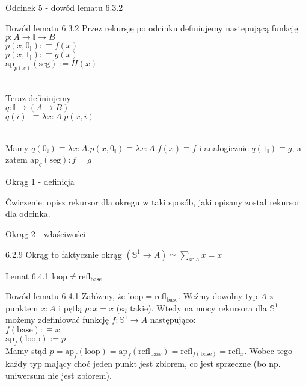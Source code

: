 \documentclass{beamer}
\newcommand{\defn}{:\equiv}
\newcommand{\refl}[1]{\text{refl}_{#1}}
\newcommand{\ap}[2]{\text{ap}_{#1}(#2)}
\newcommand{\hS}{\mathbb{S}^1}
\newcommand{\base}{\text{base}}
\newcommand{\looop}{\text{loop}}
\newcommand{\I}{\mathbb{I}}
\newcommand{\IZ}{0_\mathbb{I}}
\newcommand{\II}{1_\mathbb{I}}
\newcommand{\seg}{\text{seg}}
\begin{document}
\begin{frame}{Odcinek 5 - dowód lematu 6.3.2}
\begin{block}{Dowód lematu 6.3.2}
	Przez rekursję po odcinku definiujemy nastepującą funkcję: \\
	$p : A \to \I \to B$ \\
	$p(x, \IZ) \defn f(x)$ \\
	$p(x, \II) \defn g(x)$ \\
	$\ap{p(x)}{\seg} := H(x)$ \\~\
	
	Teraz definiujemy \\
	$q : \I \to (A \to B)$ \\
	$q(i) \defn \lambda x : A. p(x, i)$ \\~\
	
	Mamy $q(\IZ) \equiv \lambda x : A. p(x, \IZ) \equiv \lambda x : A. f(x) \equiv f$ i analogicznie $q(\II) \equiv g$, a zatem $\ap{q}{\seg} : f = g$
\end{block}
\end{frame}


\begin{frame}{Okrąg 1 - definicja}


Ćwiczenie: opisz rekursor dla okręgu w taki sposób, jaki opisany został rekursor dla odcinka.

\end{frame}

\begin{frame}{Okrąg 2 - właściwości}
	
\begin{block}{6.2.9 Okrąg to faktycznie okrąg}
$(\hS \to A) \simeq \sum_{x : A} x = x$
\end{block}

\begin{block}{Lemat 6.4.1}
$\looop \neq \refl{\base}$
\end{block}

\begin{block}{Dowód lematu 6.4.1}
Załóżmy, że $\looop = \refl{\base}$. Weźmy dowolny typ $A$ z punktem $x : A$ i pętlą $p : x = x$ (są takie). Wtedy na mocy rekursora dla $\hS$ możemy zdefiniować funkcję $f : \hS \to A$ następująco: \\

$f(\base) \defn x$ \\
$\ap{f}{\looop} := p$ \\

Mamy stąd $p = \ap{f}{\looop} = \ap{f}{\refl{\base}} = \refl{f(\base)} = \refl{x}$. Wobec tego każdy typ mający choć jeden punkt jest zbiorem, co jest sprzeczne (bo np. uniwersum nie jest zbiorem).
\end{block}

\end{frame}
\end{document}

